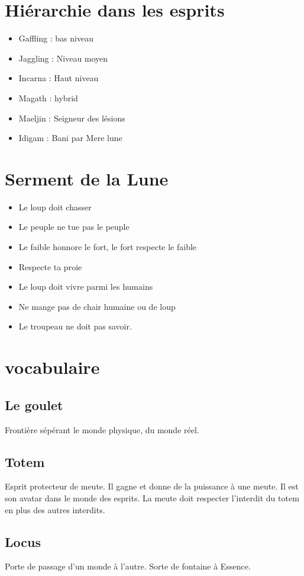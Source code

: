 \documentclass[oneside,12pt]{book}
\begin{document}
\begin{flushleft}
\section{Hiérarchie dans les esprits}
\begin{itemize}
\item Gaffling : bas niveau 
\item Jaggling : Niveau moyen
\item Incarna :  Haut niveau
\item Magath : hybrid
\item Maeljin : Seigneur des lésions
\item Idigam : Bani par Mere lune
\end{itemize}

\section{Serment de la Lune}
\begin{itemize}
\item  Le loup doit chasser
\item  Le peuple ne tue pas le peuple
\item  Le faible honnore le fort, le fort respecte le faible
\item  Respecte ta proie
\item  Le loup doit vivre parmi les humains
\item  Ne mange pas de chair humaine ou de loup
\item  Le troupeau ne doit pas savoir. 
\end{itemize}

\section{vocabulaire}
\subsection{Le goulet}
Frontière sépérant le monde physique, du monde réel.
\subsection{Totem}
Esprit protecteur de meute. Il gagne et donne de la puissance à une meute. Il est son avatar dans le monde des esprits. La meute doit respecter l'interdit du totem en plus des autres interdits. 

\subsection{Locus}
Porte de passage d'un monde à l'autre. Sorte de fontaine à Essence.
 

\end{flushleft}
\end{document}
